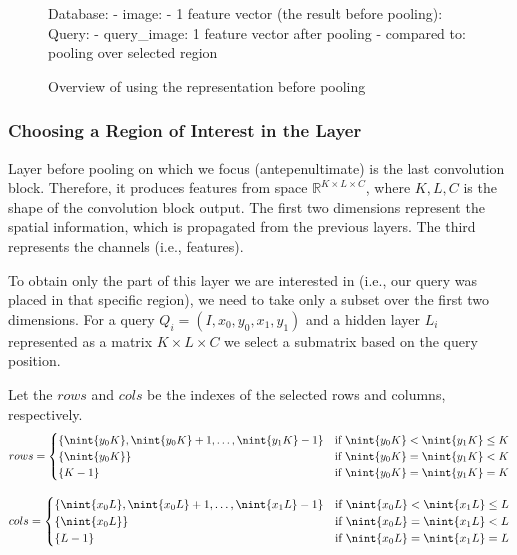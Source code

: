 \begin{figure}
\centering
\begin{boxedverbatim}
Database:
    - image:
        - 1 feature vector (the result before pooling):
Query:
    - query_image: 1 feature vector after pooling
    - compared to: pooling over selected region
\end{boxedverbatim}
\caption{Overview of using the representation before pooling}
\label{fig:antepenultimate_overview}
\end{figure}


\subsubsection{Choosing a Region of Interest in the Layer}

Layer before pooling on which we focus (antepenultimate) is the last convolution block. Therefore, it produces features from space $\mathbb{R}^{K\times L \times C}$, where $K, L, C$ is the shape of the convolution block output. The first two dimensions represent the spatial information, which is propagated from the previous layers. The third represents the channels (i.e., features).

To obtain only the part of this layer we are interested in (i.e., our query was placed in that specific region), we need to take only a subset over the first two dimensions. For a query $Q_i = (I, x_0, y_0, x_1, y_1)$ and a hidden layer $L_i$ represented as a matrix $K \times L \times C$ we select a submatrix based on the query position. 

Let the $rows$ and $cols$ be the indexes of the selected rows and columns, respectively. 
$$
    rows =
    \begin{cases}
        \{\nint{y_0 K}, \nint{y_0 K} + 1, \ldots, \nint{y_1 K}-1\} & \text{if } \nint{y_0K} < \nint{y_1K} \leq K \\
        \{\nint{y_0K}\} & \text{if } \nint{y_0K} = \nint{y_1K} < K\\
        \{K-1\} & \text{if } \nint{y_0K} = \nint{y_1K} = K\\
    \end{cases}
$$

$$
    cols =
    \begin{cases}
        \{\nint{x_0 L}, \nint{x_0 L} + 1, \ldots, \nint{x_1 L}-1\} & \text{if } \nint{x_0L} < \nint{x_1L} \leq L \\
        \{\nint{x_0L}\} & \text{if } \nint{x_0L} = \nint{x_1L} < L\\
        \{L-1\} & \text{if } \nint{x_0L} = \nint{x_1L} = L\\
    \end{cases}
$$

